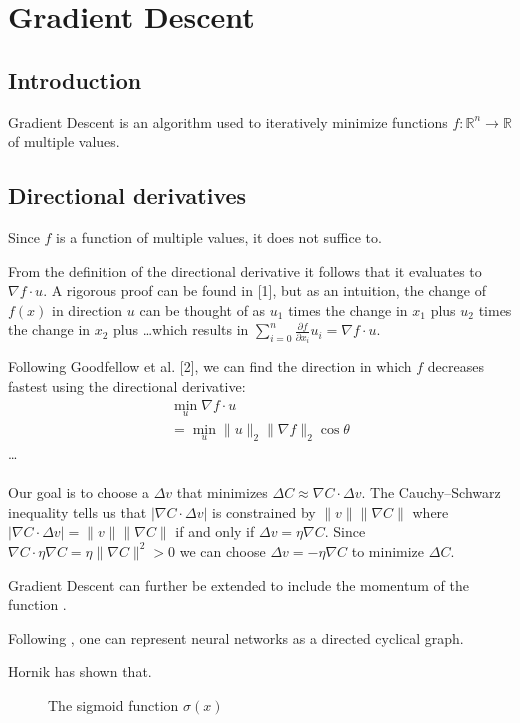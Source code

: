 \section{Gradient Descent}
\subsection{Introduction}
Gradient Descent is an algorithm used to iteratively minimize functions $f: \mathbb{R}^n \to \mathbb{R}$ of multiple values.

\subsection{Directional derivatives}
Since $f$ is a function of multiple values, it does not suffice to.

From the definition of the directional derivative it follows that it evaluates to $\nabla f \cdot u$. A rigorous proof can be found in [1], but as an intuition, the change of $f(x)$ in direction $u$ can be thought of as $u_1$ times the change in $x_1$ plus $u_2$ times the change in $x_2$ plus \ldots which results in $\sum_{i=0}^{n}\frac{\partial f}{\partial x_i}u_i = \nabla f \cdot u$.

Following Goodfellow et al. [2], we can find the direction in which $f$ decreases fastest using the directional derivative:
\begin{equation*}
\begin{gathered}
\min_u \nabla f \cdot u \\
= \min_u \lVert u \rVert_2 \lVert \nabla f \rVert_2 \cos \theta
\end{gathered}
\end{equation*}
\ldots
\\\\
Our goal is to choose a $\Delta v$ that minimizes $\Delta C \approx \nabla C \cdot \Delta v$. The Cauchy--Schwarz inequality tells us that $|\nabla C \cdot \Delta v|$ is constrained by $\lVert v \rVert \lVert \nabla C \rVert$ where $|\nabla C \cdot \Delta v| = \lVert v \rVert \lVert \nabla C \rVert$ if and only if $\Delta v = \eta \nabla C$.
Since $\nabla C \cdot \eta \nabla C = \eta \lVert \nabla C \rVert^2 > 0$ we can choose $\Delta v = -\eta \nabla C$ to minimize $\Delta C$.

Gradient Descent can further be extended to include the momentum of the function \cite{DBLP:journals/corr/Ruder16}.

Following \cite{Goodfellow-et-al-2016}, one can represent neural networks as a directed cyclical graph.

Hornik\cite{DBLP:journals/nn/Hornik91} has shown that.


\begin{figure}
	\begin{center}
		
	\end{center}
	\caption{The sigmoid function $\sigma(x)$}
\end{figure}

\begin{figure}
	\begin{center}
		
	\end{center}
\end{figure}